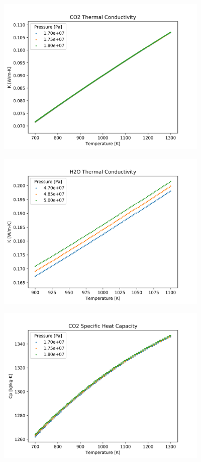 \begin{figure}[h]
    \centering
    \includegraphics[width=4in]{../images/property_plots/CO2_Thermal_Conductivity.png}
\end{figure}

\begin{figure}[h]
    \centering
    \includegraphics[width=4in]{../images/property_plots/H2O_Thermal_Conductivity.png}
\end{figure}

\begin{figure}[h]
    \centering
    \includegraphics[width=4in]{../images/property_plots/CO2_Specific_Heat_Capacity.png}
\end{figure}


